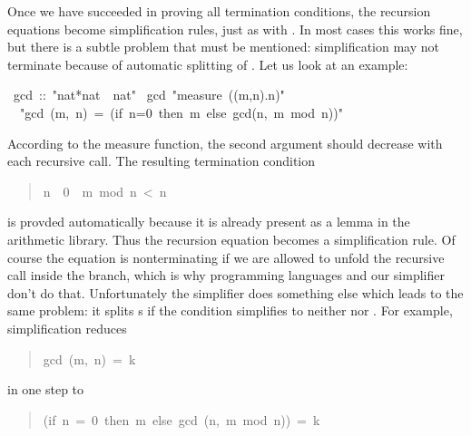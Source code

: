 \begin{isabelle}%
%
\begin{isamarkuptext}%
Once we have succeeded in proving all termination conditions, the recursion
equations become simplification rules, just as with
. In most cases this works fine, but there is a subtle
problem that must be mentioned: simplification may not
terminate because of automatic splitting of .
Let us look at an example:%
\end{isamarkuptext}%
\ gcd\ ::\ {"}nat*nat\ {\isasymRightarrow}\ nat{"}\isanewline
{}\ gcd\ {"}measure\ ({\isasymlambda}(m,n).n){"}\isanewline
\ \ {"}gcd\ (m,\ n)\ =\ (if\ n=0\ then\ m\ else\ gcd(n,\ m\ mod\ n)){"}%
\begin{isamarkuptext}%
\noindent
According to the measure function, the second argument should decrease with
each recursive call. The resulting termination condition
\begin{quote}

\begin{isabelle}%
\mbox{n}\ {\isasymnoteq}\ 0\ {\isasymLongrightarrow}\ \mbox{m}\ mod\ \mbox{n}\ <\ \mbox{n}
\end{isabelle}%

\end{quote}
is provded automatically because it is already present as a lemma in the
arithmetic library. Thus the recursion equation becomes a simplification
rule. Of course the equation is nonterminating if we are allowed to unfold
the recursive call inside the  branch, which is why programming
languages and our simplifier don't do that. Unfortunately the simplifier does
something else which leads to the same problem: it splits s if the
condition simplifies to neither  nor . For
example, simplification reduces
\begin{quote}

\begin{isabelle}%
gcd\ (\mbox{m},\ \mbox{n})\ =\ \mbox{k}
\end{isabelle}%

\end{quote}
in one step to
\begin{quote}

\begin{isabelle}%
(if\ \mbox{n}\ =\ 0\ then\ \mbox{m}\ else\ gcd\ (\mbox{n},\ \mbox{m}\ mod\ \mbox{n}))\ =\ \mbox{k}
\end{isabelle}%


\end{quote}
\end{isamarkuptext}
\end{isabelle}
